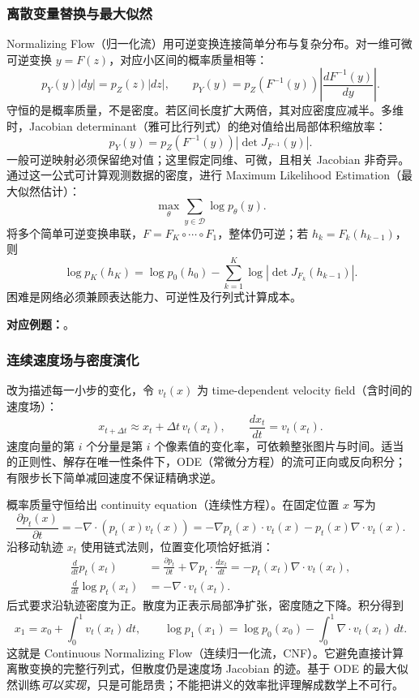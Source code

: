 \subsubsection*{离散变量替换与最大似然}

Normalizing Flow（归一化流）用可逆变换连接简单分布与复杂分布。对一维可微可逆变换 $y=F(z)$，对应小区间的概率质量相等：
\[
  p_Y(y)|dy|=p_Z(z)|dz|,
  \qquad
  p_Y(y)=p_Z(F^{-1}(y))\left|\frac{dF^{-1}(y)}{dy}\right|.
\]
守恒的是概率质量，不是密度。若区间长度扩大两倍，其对应密度应减半。多维时，Jacobian determinant（雅可比行列式）的绝对值给出局部体积缩放率：
\[
  \boxed{p_Y(y)=p_Z(F^{-1}(y))\left|\det J_{F^{-1}}(y)\right|}.
\]
一般可逆映射必须保留绝对值；这里假定同维、可微，且相关 Jacobian 非奇异。通过这一公式可计算观测数据的密度，进行 Maximum Likelihood Estimation（最大似然估计）：
\[
  \max_\theta\sum_{y\in\mathcal D}\log p_\theta(y).
\]
将多个简单可逆变换串联，$F=F_K\circ\cdots\circ F_1$，整体仍可逆；若 $h_k=F_k(h_{k-1})$，则
\[
  \log p_K(h_K)=\log p_0(h_0)
    -\sum_{k=1}^{K}\log|\det J_{F_k}(h_{k-1})|.
\]
困难是网络必须兼顾表达能力、可逆性及行列式计算成本。

\textbf{对应例题：}。

\subsubsection*{连续速度场与密度演化}

改为描述每一小步的变化，令 $v_t(x)$ 为 time-dependent velocity field（含时间的速度场）：
\[
  x_{t+\Delta t}\approx x_t+\Delta t\,v_t(x_t),
  \qquad \boxed{\frac{dx_t}{dt}=v_t(x_t)}.
\]
速度向量的第 $i$ 个分量是第 $i$ 个像素值的变化率，可依赖整张图片与时间。适当的正则性、解存在唯一性条件下，ODE（常微分方程）的流可正向或反向积分；有限步长下简单减回速度不保证精确求逆。

概率质量守恒给出 continuity equation（连续性方程）。在固定位置 $x$ 写为
\[
  \frac{\partial p_t(x)}{\partial t}
  =-\nabla\!\cdot(p_t(x)v_t(x))
  =-\nabla p_t(x)\cdot v_t(x)-p_t(x)\nabla\!\cdot v_t(x).
\]
沿移动轨迹 $x_t$ 使用链式法则，位置变化项恰好抵消：
\begin{align*}
  \frac{d}{dt}p_t(x_t)
  &=\frac{\partial p_t}{\partial t}
    +\nabla p_t\cdot\frac{dx_t}{dt}
    =-p_t(x_t)\nabla\!\cdot v_t(x_t),\\
  \boxed{\frac{d}{dt}\log p_t(x_t)}
  &=\boxed{-\nabla\!\cdot v_t(x_t)}.
\end{align*}
后式要求沿轨迹密度为正。散度为正表示局部净扩张，密度随之下降。积分得到
\[
  x_1=x_0+\int_0^1v_t(x_t)\,dt,\qquad
  \log p_1(x_1)=\log p_0(x_0)-\int_0^1\nabla\!\cdot v_t(x_t)\,dt.
\]
这就是 Continuous Normalizing Flow（连续归一化流，CNF）。它避免直接计算离散变换的完整行列式，但散度仍是速度场 Jacobian 的迹。基于 ODE 的最大似然训练\emph{可以实现}，只是可能昂贵；不能把讲义的效率批评理解成数学上不可行。


